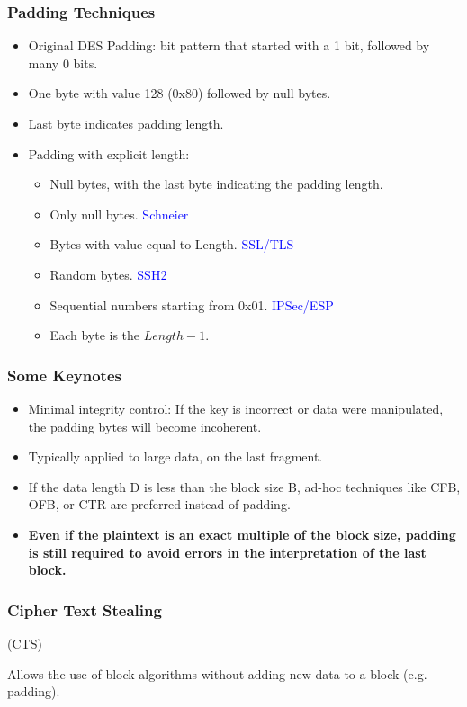 \subsubsection*{Padding Techniques}
\begin{itemize}
    \item Original DES Padding: bit pattern that started with a 1 bit, followed by many 0 bits.
    \item One byte with value 128 (0x80) followed by null bytes.
    \item Last byte indicates padding length.
    \item Padding with explicit length:
    \begin{itemize}
        \item Null bytes, with the last byte indicating the padding length.
        \item Only null bytes. \textcolor{Blue}{Schneier}
        \item Bytes with value equal to Length. \textcolor{Blue}{SSL/TLS}
        \item Random bytes. \textcolor{Blue}{SSH2}
        \item Sequential numbers starting from 0x01. \textcolor{Blue}{IPSec/ESP}
        \item Each byte is the $Length-1$.
    \end{itemize}
\end{itemize}

\subsubsection*{Some Keynotes}
\begin{itemize}
    \item Minimal integrity control: If the key is incorrect or data were manipulated, the padding bytes will become incoherent.
    \item Typically applied to large data, on the last fragment.
    \item If the data length D is less than the block size B, ad-hoc techniques like CFB, OFB, or CTR are preferred instead of padding.
    \item \textbf{Even if the plaintext is an exact multiple of the block size, padding is still required to avoid errors in the interpretation of the last block.}
\end{itemize}

\subsubsection{Cipher Text Stealing}
\begin{center}
    (CTS)
\end{center}
Allows the use of block algorithms without adding new data to a block (e.g. padding).

